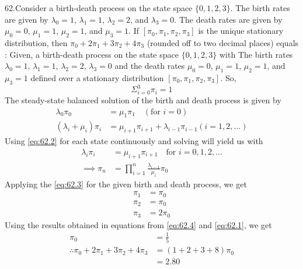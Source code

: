 \documentclass[journal,12pt,twocolumn]{IEEEtran}
\theoremstyle{remark}
\begin{document}
\renewcommand{\thefigure}{\theenumi}
\renewcommand{\thetable}{\theenumi}
62.Consider a birth-death process on the state space $\{0, 1, 2, 3\}$. The birth rates are
given by $\lambda_0 = 1$, $\lambda_1 = 1$, $\lambda_2 = 2$, and $\lambda_3 = 0$. The death rates are given by
$\mu_0 = 0$, $\mu_1 = 1$, $\mu_2 = 1$, and $\mu_3 = 1$. If $[\pi_0, \pi_1, \pi_2, \pi_3]$ is the unique
stationary distribution, then $\pi_0 + 2\pi_1 + 3\pi_2 + 4\pi_3$ (rounded off to two decimal places) equals
\\ \solution:
Given, a birth-death process on the state space $\{0, 1, 2, 3\}$ with The birth rates $\lambda_0 = 1$, $\lambda_1 = 1$, $\lambda_2 = 2$, $\lambda_3 = 0$ and the death rates $\mu_0 = 0$, $\mu_1 = 1$, $\mu_2 = 1$, and $\mu_3 = 1$ defined over a stationary distribution $[\pi_0, \pi_1, \pi_2, \pi_3]$. So,
\begin{equation}
\label{eq:62.1}
\Sigma_{i=0}^3 \pi_i = 1
\end{equation}
The steady-state balanced solution of the birth and death process is given by
\begin{equation}
\label{eq:62.2}
\begin{split}
\lambda_0\pi_0 &= \mu_1\pi_1 \quad (\text{for } i = 0)\\
(\lambda_i + \mu_i)\pi_i &= \mu_{i+1}\pi_{i+1} + \lambda_{i-1}\pi_{i-1} (i = 1,2,\ldots)
\end{split}
\end{equation}
Using \eqref{eq:62.2} for each state continuously and solving will yield us with
\begin{equation}
\label{eq:62.3}
\begin{split}
\lambda_i\pi_i &= \mu_{i+1}\pi_{i+1} \quad \text{for } i = 0,1,2,\ldots\\
\implies \pi_n &= \prod_{i=1}^n \frac{\lambda_{i-1}}{\mu_{i}} \pi_0
\end{split}
\end{equation}
Applying the \eqref{eq:62.3} for the given birth and death process, we get
\begin{equation}
\label{eq:62.4}
\begin{split}
\pi_1 &= \pi_0\\
\pi_2 &= \pi_0\\
\pi_3 &= 2\pi_0
\end{split}
\end{equation}
Using the results obtained in equations from \eqref{eq:62.4} and \eqref{eq:62.1}, we get
\begin{equation}
\begin{split}
\pi_0 &= \frac{1}{5}\\
\therefore \pi_0 + 2\pi_1 + 3\pi_2 + 4\pi_3 &= (1+2+3+8)\pi_0\\
&= 2.80
\end{split}
\end{equation}
\end{document}
